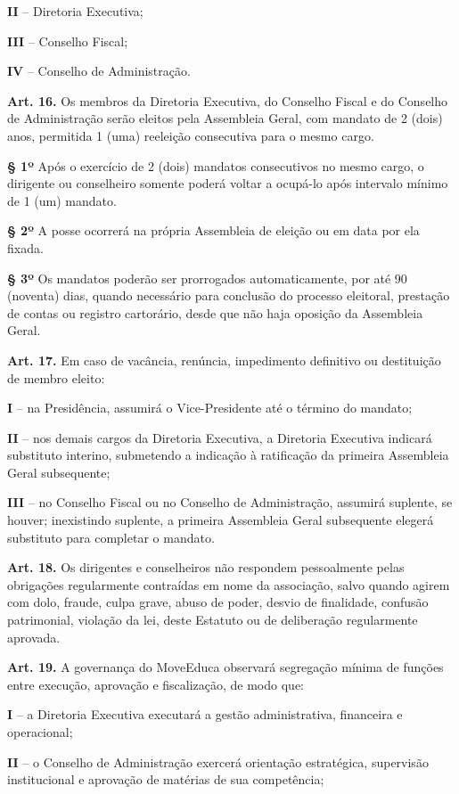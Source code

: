 \documentclass[11pt,a4paper]{article}
\begin{document}
\textbf{II} -- Diretoria Executiva;

\textbf{III} -- Conselho Fiscal;

\textbf{IV} -- Conselho de Administração.

\textbf{Art. 16.} Os membros da Diretoria Executiva, do Conselho Fiscal e do Conselho de Administração serão eleitos pela Assembleia Geral, com mandato de 2 (dois) anos, permitida 1 (uma) reeleição consecutiva para o mesmo cargo.

\textbf{§ 1º} Após o exercício de 2 (dois) mandatos consecutivos no mesmo cargo, o dirigente ou conselheiro somente poderá voltar a ocupá-lo após intervalo mínimo de 1 (um) mandato.

\textbf{§ 2º} A posse ocorrerá na própria Assembleia de eleição ou em data por ela fixada.

\textbf{§ 3º} Os mandatos poderão ser prorrogados automaticamente, por até 90 (noventa) dias, quando necessário para conclusão do processo eleitoral, prestação de contas ou registro cartorário, desde que não haja oposição da Assembleia Geral.

\textbf{Art. 17.} Em caso de vacância, renúncia, impedimento definitivo ou destituição de membro eleito:

\textbf{I} -- na Presidência, assumirá o Vice-Presidente até o término do mandato;

\textbf{II} -- nos demais cargos da Diretoria Executiva, a Diretoria Executiva indicará substituto interino, submetendo a indicação à ratificação da primeira Assembleia Geral subsequente;

\textbf{III} -- no Conselho Fiscal ou no Conselho de Administração, assumirá suplente, se houver; inexistindo suplente, a primeira Assembleia Geral subsequente elegerá substituto para completar o mandato.

\textbf{Art. 18.} Os dirigentes e conselheiros não respondem pessoalmente pelas obrigações regularmente contraídas em nome da associação, salvo quando agirem com dolo, fraude, culpa grave, abuso de poder, desvio de finalidade, confusão patrimonial, violação da lei, deste Estatuto ou de deliberação regularmente aprovada.

\textbf{Art. 19.} A governança do MoveEduca observará segregação mínima de funções entre execução, aprovação e fiscalização, de modo que:

\textbf{I} -- a Diretoria Executiva executará a gestão administrativa, financeira e operacional;

\textbf{II} -- o Conselho de Administração exercerá orientação estratégica, supervisão institucional e aprovação de matérias de sua competência;
\end{document}
